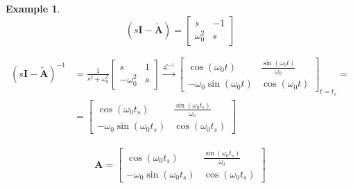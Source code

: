 \documentclass[11pt,a4paper,oneside]{book}
\numberwithin{equation}{section}
\theoremstyle{it}
\theoremstyle{definition}
\newtheorem{example}{Example}[chapter]
\begin{document}
\begin{example}
	\begin{equation}
		\left(s\mathbf{I}-\tilde{\mathbf{A}} \right) = 
		\left[ \begin{matrix}
			s & -1 \\[6pt]
			\omega_0^2 & s
		\end{matrix}\right]
	\end{equation}
	
	\begin{equation}
		\begin{aligned}
			\left(s\mathbf{I}-\tilde{\mathbf{A}} \right)^{-1} &= 
			\frac{1}{s^2+\omega_0^2}\left[ \begin{matrix}
				s & 1 \\[6pt]
				-\omega_0^2 & s
			\end{matrix}\right] \xrightarrow{\mathcal{L}^{-1}} 
			\left[ 
			\begin{matrix}
				\cos(\omega_0t) & \frac{\sin(\omega_0t)}{\omega_0} \\[8pt]
				-\omega_0 \sin(\omega_0t) & \cos(\omega_0t)
			\end{matrix}
			\right]_{t=t_s} = \\[12pt]
			& = \left[ 
			\begin{matrix}
				\cos(\omega_0t_s) & \frac{\sin(\omega_0t_s)}{\omega_0} \\[8pt]
				-\omega_0 \sin(\omega_0t_s) & \cos(\omega_0t_s)
			\end{matrix}
			\right]
		\end{aligned}
	\end{equation}
	
	\begin{equation}
		\begin{aligned}
			\mathbf{A} =\left[ 
			\begin{matrix}
				\cos(\omega_0t_s) & \frac{\sin(\omega_0t_s)}{\omega_0} \\[8pt]
				-\omega_0 \sin(\omega_0t_s) & \cos(\omega_0t_s)
			\end{matrix}
			\right]
		\end{aligned}
	\end{equation}
	

\end{example}
\end{document}

